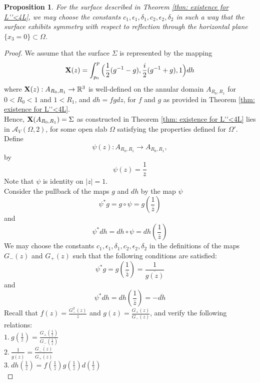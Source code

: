 \documentclass[11pt]{amsart}
\numberwithin{equation}{section}
\theoremstyle{theorem}
\newtheorem{proposition}[theorem]{Proposition}
\theoremstyle{definition}
\numberwithin{equation}{section}
\begin{document}
\begin{proposition} \label{prop: symm.surface with L''<L}
    For the surface described in Theorem \ref{thm: existence for L''<4L}, we may choose the constants $c_1,\epsilon_1, \delta_1, c_2, \epsilon_2, \delta_2$ in such a way that the surface exhibits symmetry with respect to reflection through the horizontal plane $\{ x_3=0\} \subset \Omega$. 
\end{proposition}
\begin{proof}
    We assume that the surface $\Sigma$ is represented by the mapping 
    $$
    \bold{X}(z)=\int_{p_0}^p\Big( \frac{1}{2}(g^{-1}-g),\frac{i}{2}(g^{-1}+g),1\Big)dh
    $$
    where $\bold{X}(z):A_{R_0,R_1}\rightarrow \mathbb{R}^3$ is well-defined on the annular domain $A_{R_0,R_1}$ for $0<R_0<1$ and $1<R_1$, and  $dh=fgdz$, for $f$ and $g$ as provided in Theorem \ref{thm: existence for L''<4L}.  \\
    Hence, $\bold{X}(A_{R_0,R_1})=\Sigma$ as constructed in Theorem \ref{thm: existence for L''<4L} lies in $ \mathcal{A}_V(\Omega, 2)$, for some open slab $\Omega$ satisfying the properties defined for $\Omega'$. \\
   Define 
    $$
    \psi(z):A_{R_0,R_1}\rightarrow A_{R_0,R_1}, 
    $$
     by
    $$
     \psi(z)=\frac{1}{\bar{z}}
    $$
    Note that $\psi$ is identity on $\vert z\vert =1$.\\
    Consider the pullback of the maps $g$ and $dh$ by the map $\psi$
    $$
    \psi^*g=g\circ \psi =g(\frac{1}{\bar{z}})
    $$
  and
  $$
  \psi^*dh=dh\circ \psi = dh(\frac{1}{\bar{z}})
  $$
  We may choose the constants $c_1,\epsilon_1, \delta_1, c_2, \epsilon_2, \delta_2$  in the definitions of the maps $G_-(z)$ and $G_+(z)$ such that the following conditions are satisfied:
  $$
  \psi^*g=g(\frac{1}{\bar{z}})=\frac{1}{\overline{g(z)}}
  $$
  and
  $$
  \psi^*dh=dh(\frac{1}{\bar{z}})=-\overline{dh}
  $$
  Recall that $f(z)=\frac{G_-^2(z)}{z}$ and $g(z)=\frac{G_+(z)}{G_-(z)}$, and verify the following relations:\\
  
  $1.\ g(\frac{1}{\bar{z}})=\frac{G_+(\frac{1}{\bar{z}})}{G_-(\frac{1}{\bar{z}})} $ \\
  
 $
 2.\  \frac{1}{\overline{g(z)}}=\frac{\overline{G_-(z)}}{\overline{G_+(z)}}
 $ \\
 
  $
  3.\ dh(\frac{1}{\bar{z}})= f(\frac{1}{\bar{z}})g(\frac{1}{\bar{z}}) d(\frac{1}{\bar{z}}) $\\
  

\end{proof}
\end{document}
